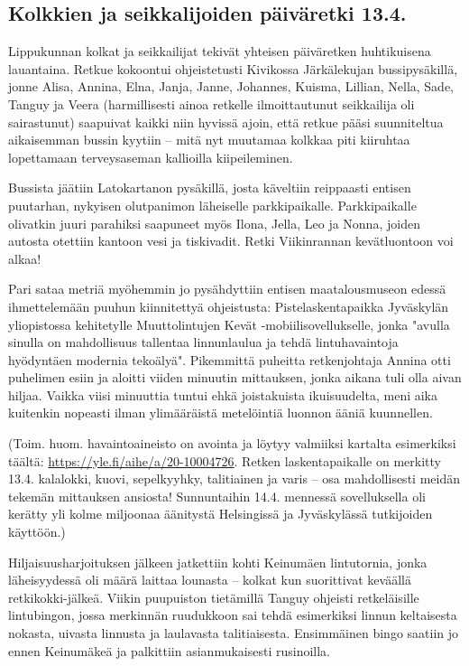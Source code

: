 
\clearpage
\subsection{Kolkkien ja seikkalijoiden päiväretki 13.4.}

\begin{multicols}{2}

	Lippukunnan kolkat ja seikkailijat tekivät yhteisen päiväretken
	huhtikuisena lauantaina. Retkue kokoontui ohjeistetusti Kivikossa
	Järkälekujan bussipysäkillä, jonne Alisa, Annina, Elna, Janja, Janne,
	Johannes, Kuisma, Lillian, Nella, Sade, Tanguy ja Veera (harmillisesti
	ainoa retkelle ilmoittautunut seikkailija oli sairastunut) saapuivat
	kaikki niin hyvissä ajoin, että retkue pääsi suunniteltua aikaisemman
	bussin kyytiin – mitä nyt muutamaa kolkkaa piti kiiruhtaa lopettamaan
	terveysaseman kallioilla kiipeileminen.

	Bussista jäätiin Latokartanon pysäkillä, josta käveltiin reippaasti
	entisen puutarhan, nykyisen olutpanimon läheiselle parkkipaikalle.
	Parkkipaikalle olivatkin juuri parahiksi saapuneet myös Ilona, Jella,
	Leo ja Nonna, joiden autosta otettiin kantoon vesi ja tiskivadit. Retki
	Viikinrannan kevätluontoon voi alkaa!

	Pari sataa metriä myöhemmin jo pysähdyttiin entisen maatalousmuseon
	edessä ihmettelemään puuhun kiinnitettyä ohjeistusta:
	Pistelaskentapaikka Jyväskylän yliopistossa kehitetylle Muuttolintujen
	Kevät -mobiilisovellukselle, jonka "avulla sinulla on mahdollisuus
	tallentaa linnunlaulua ja tehdä lintuhavaintoja hyödyntäen modernia
	tekoälyä". Pikemmittä puheitta retkenjohtaja Annina otti puhelimen
	esiin ja aloitti viiden minuutin mittauksen, jonka aikana tuli olla
	aivan hiljaa. Vaikka viisi minuuttia tuntui ehkä joistakuista
	ikuisuudelta, meni aika kuitenkin nopeasti ilman ylimääräistä
	metelöintiä luonnon ääniä kuunnellen.

	(Toim. huom. havaintoaineisto on avointa ja löytyy valmiiksi kartalta
	esimerkiksi täältä:
	\href{https://yle.fi/aihe/a/20-10004726}{https://yle.fi/aihe/a/20-10004726}.
	Retken laskentapaikalle on merkitty 13.4. kalalokki, kuovi,
	sepelkyyhky, talitiainen ja varis – osa mahdollisesti meidän tekemän
	mittauksen ansiosta! Sunnuntaihin 14.4. mennessä sovelluksella oli
	kerätty yli kolme miljoonaa äänitystä Helsingissä ja Jyväskylässä
	tutkijoiden käyttöön.)

	Hiljaisuusharjoituksen jälkeen jatkettiin kohti Keinumäen lintutornia,
	jonka läheisyydessä oli määrä laittaa lounasta – kolkat kun suorittivat
	keväällä retkikokki-jälkeä. Viikin puupuiston tietämillä Tanguy
	ohjeisti retkeläisille lintubingon, jossa merkinnän ruudukkoon sai
	tehdä esimerkiksi linnun keltaisesta nokasta, uivasta linnusta ja
	laulavasta talitiaisesta. Ensimmäinen bingo saatiin jo ennen Keinumäkeä
	ja palkittiin asianmukaisesti rusinoilla.


\end{multicols}
